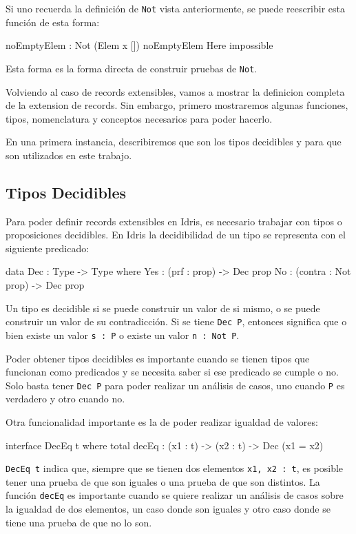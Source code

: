 Si uno recuerda la definición de \texttt{Not} vista anteriormente, se puede reescribir esta función de esta forma:

\begin{code}
noEmptyElem : Not (Elem x [])
noEmptyElem Here impossible
\end{code}

Esta forma es la forma directa de construir pruebas de \texttt{Not}.

Volviendo al caso de records extensibles, vamos a mostrar la definicion completa de la extension de records. Sin embargo, primero mostraremos algunas funciones, tipos, nomenclatura y conceptos necesarios para poder hacerlo.

En una primera instancia, describiremos que son los tipos decidibles y para que son utilizados en este trabajo.

\subsection{Tipos Decidibles}

Para poder definir records extensibles en Idris, es necesario trabajar con tipos o proposiciones decidibles. En Idris la decidibilidad de un tipo se representa con el siguiente predicado:

\begin{code}
data Dec : Type -> Type where
  Yes : (prf : prop) -> Dec prop
  No  : (contra : Not prop) -> Dec prop
\end{code}

Un tipo es decidible si se puede construir un valor de si mismo, o se puede construir un valor de su contradicción. Si se tiene \texttt{Dec P}, entonces significa que o bien existe un valor \texttt{s : P} o existe un valor \texttt{n : Not P}.

Poder obtener tipos decidibles es importante cuando se tienen tipos que funcionan como predicados y se necesita saber si ese predicado se cumple o no. Solo basta tener \texttt{Dec P} para poder realizar un análisis de casos, uno cuando \texttt{P} es verdadero y otro cuando no.

Otra funcionalidad importante es la de poder realizar igualdad de valores:

\begin{code}
interface DecEq t where
  total decEq : (x1 : t) -> (x2 : t) -> Dec (x1 = x2)
\end{code}

\texttt{DecEq t} indica que, siempre que se tienen dos elementos \texttt{x1, x2 : t}, es posible tener una prueba de que son iguales o una prueba de que son distintos. La función \texttt{decEq} es importante cuando se quiere realizar un análisis de casos sobre la igualdad de dos elementos, un caso donde son iguales y otro caso donde se tiene una prueba de que no lo son.

